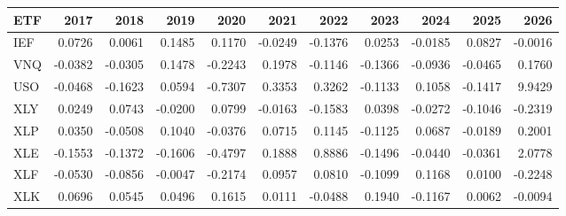 \begin{tabular}{lrrrrrrrrrr}
\toprule
ETF & 2017 & 2018 & 2019 & 2020 & 2021 & 2022 & 2023 & 2024 & 2025 & 2026 \\
\midrule
IEF & 0.0726 & 0.0061 & 0.1485 & 0.1170 & -0.0249 & -0.1376 & 0.0253 & -0.0185 & 0.0827 & -0.0016 \\
VNQ & -0.0382 & -0.0305 & 0.1478 & -0.2243 & 0.1978 & -0.1146 & -0.1366 & -0.0936 & -0.0465 & 0.1760 \\
USO & -0.0468 & -0.1623 & 0.0594 & -0.7307 & 0.3353 & 0.3262 & -0.1133 & 0.1058 & -0.1417 & 9.9429 \\
XLY & 0.0249 & 0.0743 & -0.0200 & 0.0799 & -0.0163 & -0.1583 & 0.0398 & -0.0272 & -0.1046 & -0.2319 \\
XLP & 0.0350 & -0.0508 & 0.1040 & -0.0376 & 0.0715 & 0.1145 & -0.1125 & 0.0687 & -0.0189 & 0.2001 \\
XLE & -0.1553 & -0.1372 & -0.1606 & -0.4797 & 0.1888 & 0.8886 & -0.1496 & -0.0440 & -0.0361 & 2.0778 \\
XLF & -0.0530 & -0.0856 & -0.0047 & -0.2174 & 0.0957 & 0.0810 & -0.1099 & 0.1168 & 0.0100 & -0.2248 \\
XLK & 0.0696 & 0.0545 & 0.0496 & 0.1615 & 0.0111 & -0.0488 & 0.1940 & -0.1167 & 0.0062 & -0.0094 \\
\bottomrule
\end{tabular}
